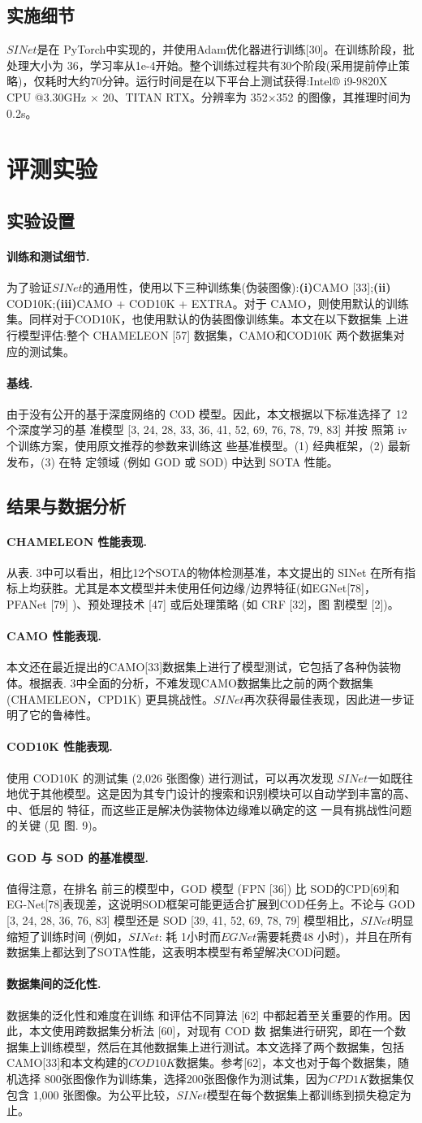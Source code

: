 \documentclass[final]{cvpr}
\newcommand{\mypara}[1]{\paragraph{#1.}}
\begin{document}
\subsection{实施细节}
$SINet$是在 PyTorch中实现的，并使用Adam优化器进行训练[30]。在训练阶段，批处理大小为 36，学习率从1e-4开始。整个训练过程共有30个阶段(采用提前停止策略)，仅耗时大约70分钟。运行时间是在以下平台上测试获得:Intel® i9-9820X CPU @3.30GHz × 20、TITAN RTX。分辨率为 352×352 的图像，其推理时间为 0.2s。
\section{评测实验}\label{sec:Experiment}
\subsection{实验设置}
\mypara{训练和测试细节}
为了验证$SINet$的通用性，使用以下三种训练集(伪装图像):\textbf{(i)}CAMO [33];\textbf{(ii)} COD10K;\textbf{(iii)}CAMO + COD10K + EXTRA。对于 CAMO，则使用默认的训练集。同样对于COD10K，也使用默认的伪装图像训练集。本文在以下数据集 上进行模型评估:整个 CHAMELEON [57] 数据集，CAMO和COD10K 两个数据集对应的测试集。\mypara{基线}由于没有公开的基于深度网络的 COD 模型。因此，本文根据以下标准选择了 12 个深度学习的基 准模型 [3, 24, 28, 33, 36, 41, 52, 69, 76, 78, 79, 83] 并按 照第 iv 个训练方案，使用原文推荐的参数来训练这 些基准模型。(1) 经典框架，(2) 最新发布，(3) 在特 定领域 (例如 GOD 或 SOD) 中达到 SOTA 性能。
\subsection{结果与数据分析}
\mypara{CHAMELEON 性能表现}从表. 3中可以看出，相比12个SOTA的物体检测基准，本文提出的 SINet 在所有指标上均获胜。尤其是本文模型并未使用任何边缘/边界特征(如EGNet[78]，PFANet [79] )、预处理技术 [47] 或后处理策略 (如 CRF [32]，图 割模型 [2])。
\mypara{CAMO 性能表现}本文还在最近提出的CAMO[33]数据集上进行了模型测试，它包括了各种伪装物 体。根据表. 3中全面的分析，不难发现CAMO数据集比之前的两个数据集 (CHAMELEON，CPD1K) 更具挑战性。$SINet$再次获得最佳表现，因此进一步证明了它的鲁棒性。
\mypara{COD10K 性能表现}使用 COD10K 的测试集 (2,026 张图像) 进行测试，可以再次发现 $SINet$一如既往地优于其他模型。这是因为其专门设计的搜索和识别模块可以自动学到丰富的高、中、低层的 特征，而这些正是解决伪装物体边缘难以确定的这 一具有挑战性问题的关键 (见 图. 9)。
\mypara{GOD 与 SOD 的基准模型}值得注意，在排名 前三的模型中，GOD 模型 (FPN [36]) 比 SOD的CPD[69]和EG-Net[78]表现差，这说明SOD框架可能更适合扩展到COD任务上。不论与 GOD [3, 24, 28, 36, 76, 83] 模型还是 SOD [39, 41, 52, 69, 78, 79]
模型相比，$SINet$明显缩短了训练时间 (例如，$SINet$: 耗 1小时而$EGNet$需要耗费48 小时)，并且在所有数据集上都达到了SOTA性能，这表明本模型有希望解决COD问题。
\mypara{数据集间的泛化性}数据集的泛化性和难度在训练 和评估不同算法 [62] 中都起着至关重要的作用。因 此，本文使用跨数据集分析法 [60]，对现有 COD 数 据集进行研究，即在一个数据集上训练模型，然后在其他数据集上进行测试。本文选择了两个数据集，包括 CAMO[33]和本文构建的$COD10K$数据集。参考[62]，本文也对于每个数据集，随机选择 800张图像作为训练集，选择200张图像作为测试集，因为$CPD1K$数据集仅包含 1,000 张图像。为公平比较，$SINet$模型在每个数据集上都训练到损失稳定为止。
\end{document}
